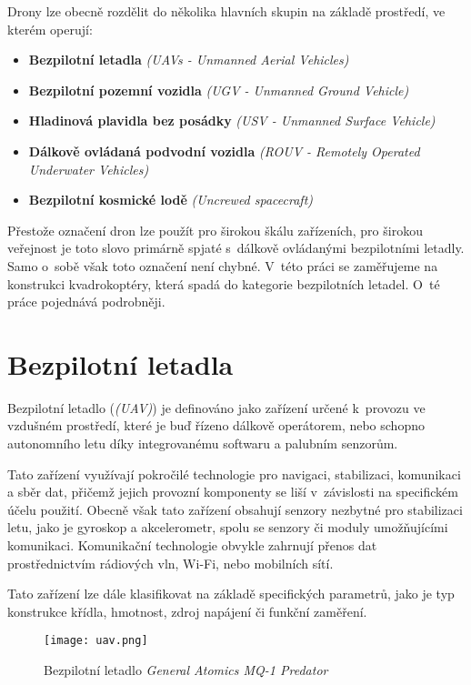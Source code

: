 \documentclass[12pt]{report}
\begin{document}
Drony lze obecně rozdělit do několika hlavních skupin na základě prostředí, ve kterém operují:
\begin{itemize}
	\item \textbf{Bezpilotní letadla} \textit{(UAVs - Unmanned Aerial Vehicles)}
	\item \textbf{Bezpilotní pozemní vozidla} \textit{(UGV - Unmanned Ground Vehicle)}
	\item \textbf{Hladinová plavidla bez posádky} \textit{(USV - Unmanned Surface Vehicle)}
	\item \textbf{Dálkově ovládaná podvodní vozidla} \textit{(ROUV - Remotely Operated Underwater Vehicles)}
	\item \textbf{Bezpilotní kosmické lodě} \textit{(Uncrewed spacecraft)}
\end{itemize}

Přestože označení dron lze použít pro širokou škálu zařízeních, pro širokou veřejnost je toto slovo primárně spjaté s~dálkově ovládanými bezpilotními letadly. Samo o~sobě však toto označení není chybné. V~této práci se zaměřujeme na konstrukci kvadrokoptéry, která spadá do kategorie bezpilotních letadel. O~té práce pojednává podrobněji. \cite{mainbook}

\section[Bezpilotní letadla]{Bezpilotní letadla}
Bezpilotní letadlo (\textit{(UAV)}) je definováno jako zařízení určené k~provozu ve vzdušném prostředí, které je buď řízeno dálkově operátorem, nebo schopno autonomního letu díky integrovanému softwaru a palubním senzorům.

Tato zařízení využívají pokročilé technologie pro navigaci, stabilizaci, komunikaci a sběr dat, přičemž jejich provozní komponenty se liší v~závislosti na specifickém účelu použití. Obecně však tato zařízení obsahují senzory nezbytné pro stabilizaci letu, jako je gyroskop a akcelerometr, spolu se senzory či moduly umožňujícími komunikaci. Komunikační technologie obvykle zahrnují přenos dat prostřednictvím rádiových vln, Wi-Fi, nebo mobilních sítí.

Tato zařízení lze dále klasifikovat na základě specifických parametrů, jako je typ konstrukce křídla, hmotnost, zdroj napájení či funkční zaměření.

\begin{figure}[H]
	\centering
	\texttt{[image: uav.png]}
	\caption{Bezpilotní letadlo \textit{General Atomics MQ-1 Predator} \cite{mainbook}}
	\label{fig:uav.png}
  \end{figure}
\end{document}
